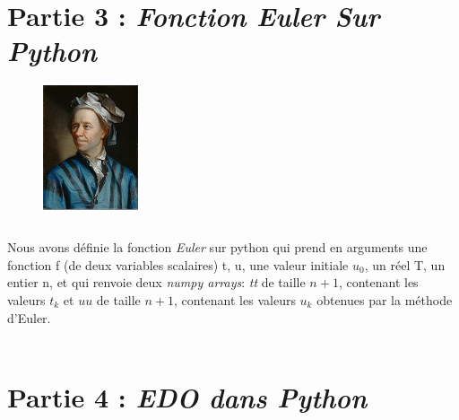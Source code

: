 \documentclass{article}
\begin{document}
\section{{\color{red}Partie 3 :} \textit{Fonction Euler Sur Python}}
\begin{figure}
    \centering
    \includegraphics[width=0.25\textwidth]{euler.jpg}

\end{figure}

$$ $$

	Nous avons définie la fonction \textit{Euler} sur python  qui prend en arguments une fonction f (de deux variables scalaires) t, u, une valeur initiale $u_0$, un réel T, un entier n, et qui renvoie deux \textit{numpy arrays}: \textit{tt} de taille $n+1$, contenant les valeurs $t_k$ et $uu$ de taille $n+1$, contenant les valeurs $u_k$ obtenues par la méthode d'Euler.
\\
\\
\section{{\color{red}Partie 4 :} \textit{EDO dans Python}}
\end{document}
